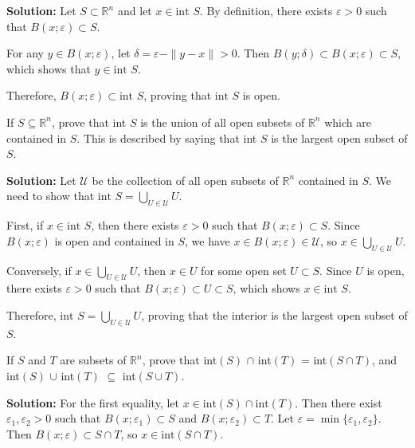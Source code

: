 \textbf{Solution:} Let $S \subset \mathbb{R}^n$ and let $x \in \text{int } S$. By definition, there exists $\varepsilon > 0$ such that $B(x;\varepsilon) \subset S$.

For any $y \in B(x;\varepsilon)$, let $\delta = \varepsilon - \|y-x\| > 0$. Then $B(y;\delta) \subset B(x;\varepsilon) \subset S$, which shows that $y \in \text{int } S$.

Therefore, $B(x;\varepsilon) \subset \text{int } S$, proving that $\text{int } S$ is open.

\begin{problembox}
If $S \subseteq \mathbb{R}^n$, prove that int $S$ is the union of all open subsets of $\mathbb{R}^n$ which are contained in $S$. This is described by saying that int $S$ is the largest open subset of $S$.
\end{problembox}

\textbf{Solution:} Let $\mathcal{U}$ be the collection of all open subsets of $\mathbb{R}^n$ contained in $S$. We need to show that $\text{int } S = \bigcup_{U \in \mathcal{U}} U$.

First, if $x \in \text{int } S$, then there exists $\varepsilon > 0$ such that $B(x;\varepsilon) \subset S$. Since $B(x;\varepsilon)$ is open and contained in $S$, we have $x \in B(x;\varepsilon) \in \mathcal{U}$, so $x \in \bigcup_{U \in \mathcal{U}} U$.

Conversely, if $x \in \bigcup_{U \in \mathcal{U}} U$, then $x \in U$ for some open set $U \subset S$. Since $U$ is open, there exists $\varepsilon > 0$ such that $B(x;\varepsilon) \subset U \subset S$, which shows $x \in \text{int } S$.

Therefore, $\text{int } S = \bigcup_{U \in \mathcal{U}} U$, proving that the interior is the largest open subset of $S$.

\begin{problembox}
If $S$ and $T$ are subsets of $\mathbb{R}^n$, prove that
int$(S)$ $\cap$ int$(T)$ = int$(S \cap T)$,
and int$(S)$ $\cup$ int$(T)$ $\subseteq$ int$(S \cup T)$.
\end{problembox}    

\textbf{Solution:} For the first equality, let $x \in \text{int}(S) \cap \text{int}(T)$. Then there exist $\varepsilon_1, \varepsilon_2 > 0$ such that $B(x;\varepsilon_1) \subset S$ and $B(x;\varepsilon_2) \subset T$. Let $\varepsilon = \min\{\varepsilon_1, \varepsilon_2\}$. Then $B(x;\varepsilon) \subset S \cap T$, so $x \in \text{int}(S \cap T)$.


